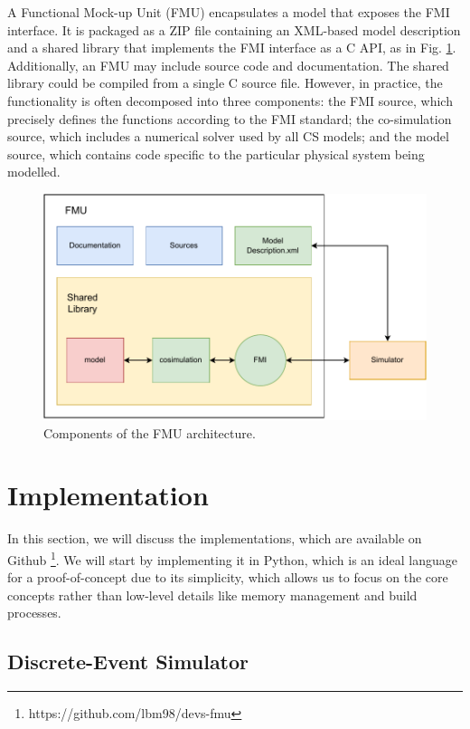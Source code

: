 \documentclass[conference]{IEEEtran}
\begin{document}
A Functional Mock-up Unit (FMU) encapsulates a model that exposes the FMI interface.
It is packaged as a ZIP file containing an XML-based model description and a shared library that implements the FMI interface as a C API, as in Fig. \ref{FMU-architecture}.
Additionally, an FMU may include source code and documentation.
The shared library could be compiled from a single C source file.
However, in practice, the functionality is often decomposed into three components: the FMI source, which precisely defines the functions according to the FMI standard; the co-simulation source, which includes a numerical solver used by all CS models; and the model source, which contains code specific to the particular physical system being modelled.

\begin{figure}[htbp]
  \centering
  \includegraphics[width=\linewidth]{images/FMU-architecture.drawio.pdf}
  \caption{Components of the FMU architecture.}
  \label{FMU-architecture}
\end{figure}

\section{Implementation}

In this section, we will discuss the implementations, which are available on Github \footnote{https://github.com/lbm98/devs-fmu}.
We will start by implementing it in Python, which is an ideal language for a proof-of-concept due to its simplicity, which allows us to focus on the core concepts rather than low-level details like memory management and build processes.

\subsection{Discrete-Event Simulator}
\end{document}

